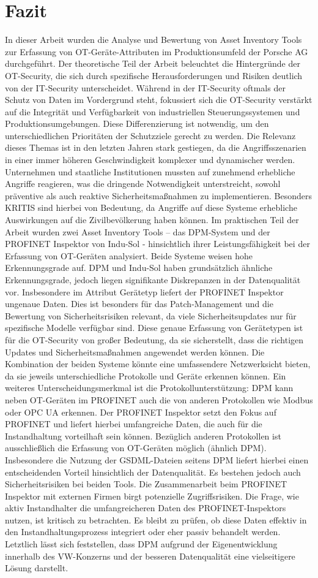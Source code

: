 \section{Fazit}

In dieser Arbeit wurden die Analyse und Bewertung von Asset Inventory Tools zur Erfassung von OT-Geräte-Attributen im Produktionsumfeld der Porsche AG durchgeführt. Der theoretische Teil der Arbeit beleuchtet die Hintergründe der OT-Security, die sich durch spezifische Herausforderungen und Risiken deutlich von der IT-Security unterscheidet. Während in der IT-Security oftmals der Schutz von Daten im Vordergrund steht, fokussiert sich die OT-Security verstärkt auf die Integrität und Verfügbarkeit von industriellen Steuerungssystemen und Produktionsumgebungen. Diese Differenzierung ist notwendig, um den unterschiedlichen Prioritäten der Schutzziele gerecht zu werden. Die Relevanz dieses Themas ist in den letzten Jahren stark gestiegen, da die Angriffsszenarien in einer immer höheren Geschwindigkeit komplexer und dynamischer werden. Unternehmen und staatliche Institutionen mussten auf zunehmend erhebliche Angriffe reagieren, was die dringende Notwendigkeit unterstreicht, sowohl präventive als auch reaktive Sicherheitsmaßnahmen zu implementieren. Besonders KRITIS sind hierbei von Bedeutung, da Angriffe auf diese Systeme erhebliche Auswirkungen auf die Zivilbevölkerung haben können. Im praktischen Teil der Arbeit wurden zwei Asset Inventory Tools – das DPM-System und der PROFINET Inspektor von Indu-Sol - hinsichtlich ihrer Leistungsfähigkeit bei der Erfassung von OT-Geräten analysiert. Beide Systeme weisen hohe Erkennungsgrade auf. DPM und Indu-Sol haben grundsätzlich ähnliche Erkennungsgrade, jedoch liegen signifikante Diskrepanzen in der Datenqualität vor. Insbesondere im Attribut Gerätetyp liefert der PROFINET Inspektor ungenaue Daten. Dies ist besonders für das Patch-Management und die Bewertung von Sicherheitsrisiken relevant, da viele Sicherheitsupdates nur für spezifische Modelle verfügbar sind. Diese genaue Erfassung von Gerätetypen ist für die OT-Security von großer Bedeutung, da sie sicherstellt, dass die richtigen Updates und Sicherheitsmaßnahmen angewendet werden können. Die Kombination der beiden Systeme könnte eine umfassendere Netzwerksicht bieten, da sie jeweils unterschiedliche Protokolle und Geräte erkennen können. Ein weiteres Unterscheidungsmerkmal ist die Protokollunterstützung: DPM kann neben OT-Geräten im PROFINET auch die von anderen Protokollen wie Modbus oder OPC UA erkennen. Der PROFINET Inspektor setzt den Fokus auf PROFINET und liefert hierbei umfangreiche Daten, die auch für die Instandhaltung vorteilhaft sein können. Bezüglich anderen Protokollen ist ausschließlich die Erfassung von OT-Geräten möglich (ähnlich DPM). Insbesondere die Nutzung der GSDML-Dateien seitens DPM liefert hierbei einen entscheidenden Vorteil hinsichtlich der Datenqualität. Es bestehen jedoch auch Sicherheitsrisiken bei beiden Tools. Die Zusammenarbeit beim PROFINET Inspektor mit externen Firmen birgt potenzielle Zugriffsrisiken. Die Frage, wie aktiv Instandhalter die umfangreicheren Daten des PROFINET-Inspektors nutzen, ist kritisch zu betrachten. Es bleibt zu prüfen, ob diese Daten effektiv in den Instandhaltungsprozess integriert oder eher passiv behandelt werden. \clearpage
\noindent Letztlich lässt sich feststellen, dass DPM aufgrund der Eigenentwicklung innerhalb des VW-Konzerns und der besseren Datenqualität eine vielseitigere Lösung darstellt. 